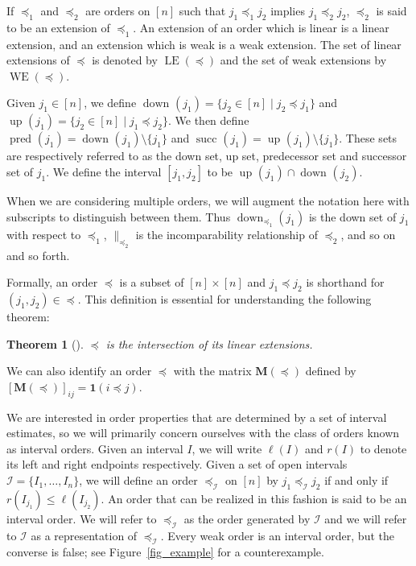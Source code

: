 \documentclass[12pt]{article}
\newcommand{\ind}[1]{\mathbf{1}(#1)}
\newcommand{\incomp}[1][]{\|_{#1}}
\newcommand{\mat}[1]{\mathbf{M}(#1)}
\newcommand{\dset}[2][]{\operatorname{down}_{#1}(#2)}
\newcommand{\uset}[2][]{\operatorname{up}_{#1}(#2)}
\newcommand{\pset}[2][]{\operatorname{pred}_{#1}(#2)}
\newcommand{\sset}[2][]{\operatorname{succ}_{#1}(#2)}
\newcommand{\LE}[1]{\operatorname{LE}(#1)}
\newcommand{\WE}[1]{\operatorname{WE}(#1)}
\newtheorem{theorem}{Theorem}
\numberwithin{theorem}{section}
\begin{document}
If $\preceq_1$ and $\preceq_2$ are orders on $[n]$ such that $j_1 \preceq_1 j_2$ implies $j_1 \preceq_2 j_2$, $\preceq_2$ is said to be an extension of $\preceq_1$.  An extension of an order which is linear is a linear extension, and an extension which is weak is a weak extension.  The set of linear extensions of $\preceq$ is denoted by $\LE{\preceq}$ and the set of weak extensions by $\WE{\preceq}$.

Given $j_1 \in [n]$, we define $\dset{j_1} = \{j_2 \in [n] \mid j_2 \preceq j_1\}$ and $\uset{j_1} = \{j_2 \in [n] \mid j_1 \preceq j_2\}$.  We then define $\pset{j_1} = \dset{j_1} \setminus \{j_1\}$ and $\sset{j_1} = \uset{j_1} \setminus \{j_1\}$.  These sets are respectively referred to as the down set, up set, predecessor set and successor set of $j_1$.  We define the interval $[j_1, j_2]$ to be $\uset{j_1} \cap \dset{j_2}$.

When we are considering multiple orders, we will augment the notation here with subscripts to distinguish between them.  Thus $\dset[\preceq_1]{j_1}$ is the down set of $j_1$ with respect to $\preceq_1$, $\incomp[\preceq_2]$ is the incomparability relationship of $\preceq_2$, and so on and so forth.

Formally, an order $\preceq$ is a subset of $[n] \times [n]$ and $j_1 \preceq j_2$ is shorthand for $(j_1, j_2) \in \preceq$.  This definition is essential for understanding the following theorem:

\begin{theorem}[\cite{dushnik1941posets}]
\label{thm_lin_ext_int}
$\preceq$ is the intersection of its linear extensions.
\end{theorem}

\noindent
We can also identify an order $\preceq$ with the matrix $\mat{\preceq}$ defined by $[\mat{\preceq}]_{ij} = \ind{i \preceq j}$.

We are interested in order properties that are determined by a set of interval estimates, so we will primarily concern ourselves with the class of orders known as interval orders.  Given an interval $I$, we will write $\ell(I)$ and $r(I)$ to denote its left and right endpoints respectively.  Given a set of open intervals $\mathcal{I} = \{I_1, \dots, I_n\}$, we will define an order $\preceq_\mathcal{I}$ on $[n]$ by $j_1 \preceq_\mathcal{I} j_2$ if and only if $r(I_{j_1}) \leq \ell(I_{j_2})$.  An order that can be realized in this fashion is said to be an interval order.  We will refer to $\preceq_\mathcal{I}$ as the order generated by $\mathcal{I}$ and we will refer to $\mathcal{I}$ as a representation of $\preceq_\mathcal{I}$.  Every weak order is an interval order, but the converse is false; see Figure~\ref{fig_example} for a counterexample.
\end{document}
